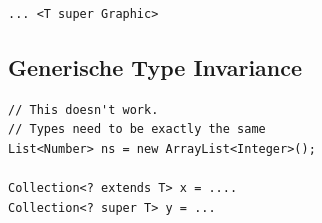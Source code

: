 \begin{multicols*}{4}
\begin{lstlisting}
... <T super Graphic>
		\end{lstlisting}
	
	\subsection{Generische Type Invariance}
		\begin{lstlisting}
// This doesn't work. 
// Types need to be exactly the same
List<Number> ns = new ArrayList<Integer>();

Collection<? extends T> x = ....
Collection<? super T> y = ...
		\end{lstlisting}


\end{multicols*}

% 

